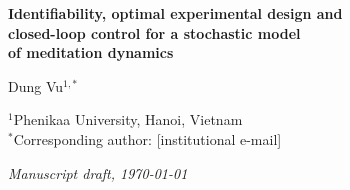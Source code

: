 \documentclass[12pt,a4paper]{article}
\theoremstyle{plain}
\theoremstyle{definition}
\theoremstyle{remark}
\begin{document}
\thispagestyle{plain}
\begin{center}
  \vspace{0.4cm}
  {\LARGE\bfseries\color{hdrcol}
    Identifiability, optimal experimental design and\\[4pt]
    closed-loop control for a stochastic model\\[4pt]
    of meditation dynamics
  }

  \vspace{0.8cm}
  {\large Dung Vu$^{1,*}$}

  \vspace{0.3cm}
  {\small
    $^{1}$Phenikaa University, Hanoi, Vietnam\\
    $^{*}$Corresponding author: [institutional e-mail] %
  }

  \vspace{0.3cm}
  {\small\itshape Manuscript draft, \today}
\end{center}
\end{document}
